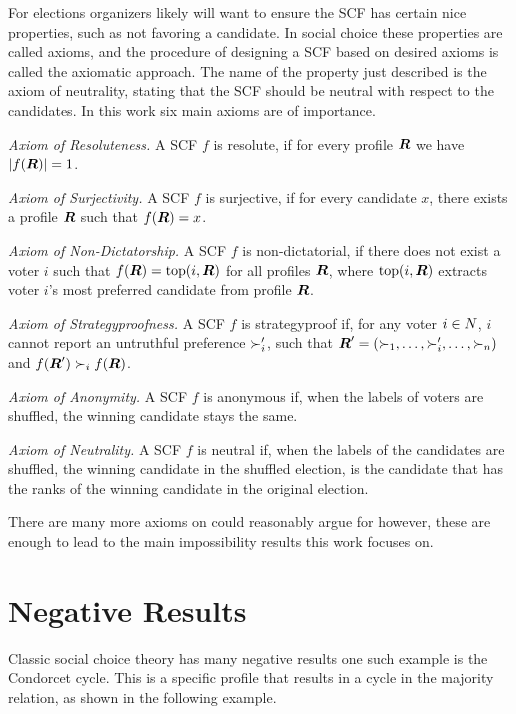 For elections organizers likely will want to ensure the SCF has certain
nice properties, such as not favoring a candidate. In social choice these
properties are called axioms, and the procedure of designing a SCF based on
desired axioms is called the axiomatic approach. The name of the property just
described is the axiom of neutrality, stating that the SCF should be
neutral with respect to the candidates. In this work six main axioms are of
importance.

\emph{Axiom of Resoluteness.} A SCF $f$ is resolute, if for every profile
$\boldsymbol{R}$ we have $|f(\boldsymbol{R})| = 1$.

\emph{Axiom of Surjectivity.} A SCF $f$ is surjective, if for every candidate
$x$, there exists a profile $\boldsymbol{R}$ such that
$f(\boldsymbol{R}) = x$.

\emph{Axiom of Non-Dictatorship.} A SCF $f$ is non-dictatorial, if there does not exist a voter $i$ such that $f(\boldsymbol{R}) = \textnormal{top}(i,\boldsymbol{R})$ for all profiles $\boldsymbol{R}$, where $\textnormal{top}(i,\boldsymbol{R})$  extracts voter $i$'s most preferred candidate from profile $\boldsymbol{R}$.

\emph{Axiom of Strategyproofness.} A SCF $f$ is strategyproof if, for any
voter $i \in N$, $i$ cannot report an untruthful preference
$\succ_i'$, such that  $\boldsymbol{R}' = (\succ_{1}, \dots,
	\succ_{i}', \dots, \succ_{n})$ and $f(\boldsymbol{R}') \succ_i
	f(\boldsymbol{R})$.

\emph{Axiom of Anonymity.} A SCF $f$ is anonymous if, when the labels of voters
are shuffled, the winning candidate stays the same.

\emph{Axiom of Neutrality.} A SCF $f$ is neutral if, when the labels of the
candidates are shuffled, the winning candidate in the shuffled election, is
the candidate that has the ranks of the winning candidate in the original
election.

There are many more axioms on could reasonably argue for however, these are
enough to lead to the main impossibility results this work focuses on.

\section{Negative Results}
\label{preliminaries: negative results}

Classic social choice theory has many negative results one such example is the
Condorcet cycle. This is a specific profile that results in a cycle in the
majority relation, as shown in the following example.


